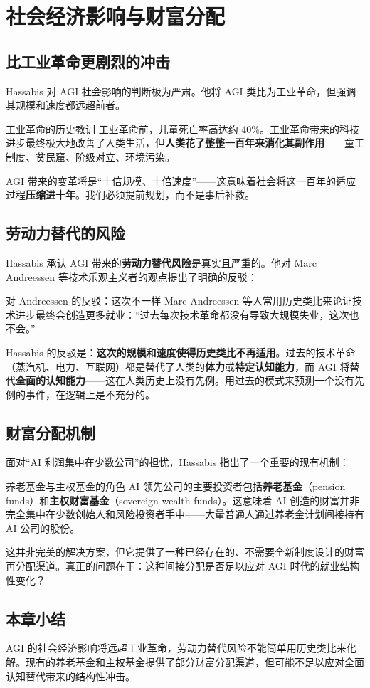 \section{社会经济影响与财富分配}

\subsection{比工业革命更剧烈的冲击}

Hassabis 对 AGI 社会影响的判断极为严肃。他将 AGI 类比为工业革命，但强调其规模和速度都远超前者。

\begin{importantbox}{工业革命的历史教训}
工业革命前，儿童死亡率高达约 40\%。工业革命带来的科技进步最终极大地改善了人类生活，但\textbf{人类花了整整一百年来消化其副作用}——童工制度、贫民窟、阶级对立、环境污染。

AGI 带来的变革将是``十倍规模、十倍速度''——这意味着社会将这一百年的适应过程\textbf{压缩进十年}。我们必须提前规划，而不是事后补救。
\end{importantbox}

\subsection{劳动力替代的风险}

Hassabis 承认 AGI 带来的\textbf{劳动力替代风险}是真实且严重的。他对 Marc Andreessen 等技术乐观主义者的观点提出了明确的反驳：

\begin{warningbox}{对 Andreessen 的反驳：这次不一样}
Marc Andreessen 等人常用历史类比来论证技术进步最终会创造更多就业：``过去每次技术革命都没有导致大规模失业，这次也不会。''

Hassabis 的反驳是：\textbf{这次的规模和速度使得历史类比不再适用}。过去的技术革命（蒸汽机、电力、互联网）都是替代了人类的\textbf{体力}或\textbf{特定认知能力}，而 AGI 将替代\textbf{全面的认知能力}——这在人类历史上没有先例。用过去的模式来预测一个没有先例的事件，在逻辑上是不充分的。
\end{warningbox}

\subsection{财富分配机制}

面对``AI 利润集中在少数公司''的担忧，Hassabis 指出了一个重要的现有机制：

\begin{knowledgebox}{养老基金与主权基金的角色}
AI 领先公司的主要投资者包括\textbf{养老基金}（pension funds）和\textbf{主权财富基金}（sovereign wealth funds）。这意味着 AI 创造的财富并非完全集中在少数创始人和风险投资者手中——大量普通人通过养老金计划间接持有 AI 公司的股份。

这并非完美的解决方案，但它提供了一种已经存在的、不需要全新制度设计的财富再分配渠道。真正的问题在于：这种间接分配是否足以应对 AGI 时代的就业结构性变化？
\end{knowledgebox}

\subsection{本章小结}

AGI 的社会经济影响将远超工业革命，劳动力替代风险不能简单用历史类比来化解。现有的养老基金和主权基金提供了部分财富分配渠道，但可能不足以应对全面认知替代带来的结构性冲击。

